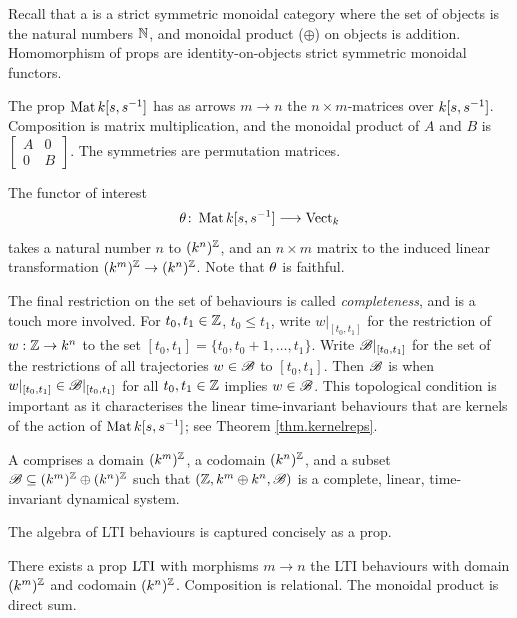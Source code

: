 Recall that a  is a strict symmetric monoidal category where the
set of objects is the natural numbers ${\mathbb N}$, and monoidal product ($\oplus$) on
objects is addition. Homomorphism of props are identity-on-objects strict
symmetric monoidal functors.

\begin{definition}
  The prop $\operatorname{\mathrm{Mat}}{k[s,s^{-1}]}$ has as arrows $m \to n$ the $n\times m$-matrices over
  ${k[s,s^{-1}]}$. Composition is matrix multiplication, and the monoidal product of $A$
  and $B$ is $\left[\begin{smallmatrix} A & 0 \\ 0 & B
  \end{smallmatrix}\right]$. The symmetries are permutation matrices.
\end{definition}

The functor of interest
\[
  \theta{\colon} \operatorname{\mathrm{Mat}}{k[s,s^{-1}]} \longrightarrow \operatorname{\mathrm{Vect}}_k
\]
takes a natural number $n$ to $(k^n)^{\mathbb Z}$, and an $n\times m$ matrix to the
induced linear transformation $(k^m)^{\mathbb Z} \to (k^n)^{\mathbb Z}$. Note that $\theta$ is
faithful.

\smallskip
The final restriction on the set of behaviours is called \emph{completeness},
and is a touch more involved. For $t_0,t_1 \in {\mathbb Z}$, $t_0 \le t_1$, write
$w|_{[t_0,t_1]}$ for the restriction of $w: {\mathbb Z} \to k^n$ to the set $[t_0,t_1] =
\{t_0, t_0+1, \dots, t_1\}$. Write  ${\mathscr B}|_{[t_0,t_1]}$ for the set of the
restrictions of all trajectories $w \in {\mathscr B}$ to $[t_0,t_1]$.  Then ${\mathscr B}$ is
 when $w|_{[t_0,t_1]} \in {\mathscr B}|_{[t_0,t_1]}$ for all $t_0,t_1
\in {\mathbb Z}$ implies $w \in {\mathscr B}$. This topological condition is important as it
characterises the linear time-invariant behaviours that are kernels of the
action of $\operatorname{\mathrm{Mat}}{k[s,s^{-1}]}$; see Theorem \ref{thm.kernelreps}.


\begin{definition}
  A  comprises a domain
  $(k^m)^{\mathbb Z}$, a codomain $(k^n)^{\mathbb Z}$, and a subset ${\mathscr B} \subseteq (k^m)^{\mathbb Z}
  \oplus (k^n)^{\mathbb Z}$ such that $({\mathbb Z},k^m \oplus k^n,{\mathscr B})$ is a complete, linear,
  time-invariant dynamical system.
\end{definition}

The algebra of LTI behaviours is captured concisely as a prop.
\begin{proposition} \label{prop.ltidsiswelldefined}
  There exists a prop $\operatorname{\mathrm{LTI}}$ 
  with morphisms $m \to n$ the LTI behaviours with domain $(k^m)^{\mathbb Z}$ and
  codomain $(k^n)^{\mathbb Z}$. Composition is relational. The monoidal product is
  direct sum.
\end{proposition}

